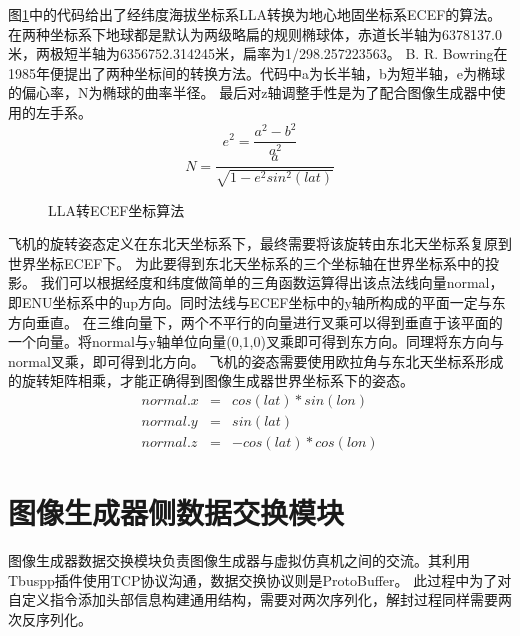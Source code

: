 \par
图\ref{LLA2ECEF}中的代码给出了经纬度海拔坐标系LLA转换为地心地固坐标系ECEF的算法。
在两种坐标系下地球都是默认为两级略扁的规则椭球体，赤道长半轴为6378137.0米，两极短半轴为6356752.314245米，扁率为1/298.257223563。
B. R. Bowring在1985年便提出了两种坐标间的转换方法\cite{cha4}。代码中a为长半轴，b为短半轴，e为椭球的偏心率，N为椭球的曲率半径。
最后对z轴调整手性是为了配合图像生成器中使用的左手系。
$$e^2=\frac{a^2-b^2}{a^2}$$
$$N=\frac{a}{\sqrt{1-e^2sin^2(lat)}}$$
\begin{figure}[h!]
    \begin{center}
        
        \caption{LLA转ECEF坐标算法}
        \label{LLA2ECEF}
    \end{center}
\end{figure}
\par
飞机的旋转姿态定义在东北天坐标系下，最终需要将该旋转由东北天坐标系复原到世界坐标ECEF下。
为此要得到东北天坐标系的三个坐标轴在世界坐标系中的投影。
我们可以根据经度和纬度做简单的三角函数运算得出该点法线向量normal，即ENU坐标系中的up方向。同时法线与ECEF坐标中的y轴所构成的平面一定与东方向垂直。
在三维向量下，两个不平行的向量进行叉乘可以得到垂直于该平面的一个向量。将normal与y轴单位向量(0,1,0)叉乘即可得到东方向。同理将东方向与normal叉乘，即可得到北方向。
飞机的姿态需要使用欧拉角与东北天坐标系形成的旋转矩阵相乘，才能正确得到图像生成器世界坐标系下的姿态。
\begin{eqnarray}    \label{eq}
    normal.x&=&cos(lat) * sin(lon)  \nonumber    \\
    normal.y&=&sin(lat) \nonumber    \\
    normal.z&=&-cos(lat) * cos(lon) \nonumber
\end{eqnarray}
\section{图像生成器侧数据交换模块}
图像生成器数据交换模块负责图像生成器与虚拟仿真机之间的交流。其利用Tbuspp插件使用TCP协议沟通，数据交换协议则是ProtoBuffer。
此过程中为了对自定义指令添加头部信息构建通用结构，需要对两次序列化，解封过程同样需要两次反序列化。
